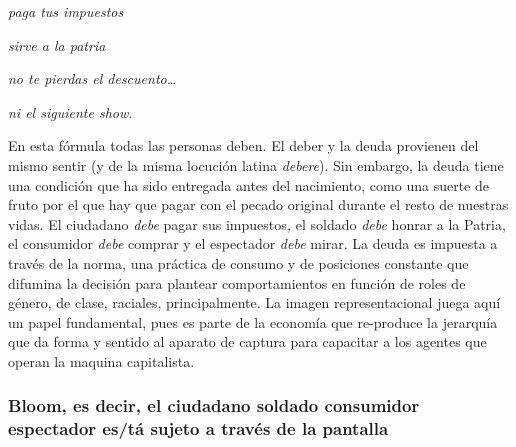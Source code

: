\documentclass[
]{article}
\begin{document}
\emph{paga tus impuestos}

\emph{sirve a la patria}

\emph{no te pierdas el descuento\ldots{}}

\emph{ni el siguiente show.}

En esta fórmula todas las personas deben. El deber y la deuda provienen
del mismo sentir (y de la misma locución latina \emph{debere}). Sin
embargo, la deuda tiene una condición que ha sido entregada antes del
nacimiento, como una suerte de fruto por el que hay que pagar con el
pecado original durante el resto de nuestras vidas. El ciudadano
\emph{debe} pagar sus impuestos\emph{,} el soldado \emph{debe} honrar a
la Patria, el consumidor \emph{debe} comprar y el espectador \emph{debe}
mirar. La deuda es impuesta a través de la norma, una práctica de
consumo y de posiciones constante que difumina la decisión para plantear
comportamientos en función de roles de género, de clase, raciales,
principalmente. La imagen representacional juega aquí un papel
fundamental, pues es parte de la economía que re-produce la jerarquía
que da forma y sentido al aparato de captura para capacitar a los
agentes que operan la maquina capitalista.

\hypertarget{bloom-es-decir-el-ciudadano-soldado-consumidor-espectador-estuxe1-sujeto-a-travuxe9s-de-la-pantalla}{%
\subsubsection{Bloom, es decir, el ciudadano soldado consumidor
espectador es/tá sujeto a través de la
pantalla}\label{bloom-es-decir-el-ciudadano-soldado-consumidor-espectador-estuxe1-sujeto-a-travuxe9s-de-la-pantalla}}
\end{document}
